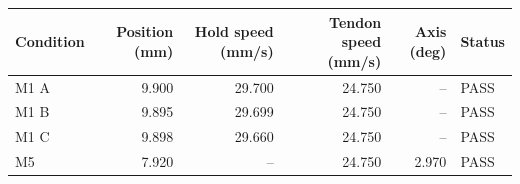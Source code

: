 \begin{tabular}{lrrrrl}
\toprule
Condition & Position (mm) & Hold speed (mm/s) & Tendon speed (mm/s) & Axis (deg) & Status \\
\midrule
M1 A & 9.900 & 29.700 & 24.750 & -- & PASS \\
M1 B & 9.895 & 29.699 & 24.750 & -- & PASS \\
M1 C & 9.898 & 29.660 & 24.750 & -- & PASS \\
M5 & 7.920 & -- & 24.750 & 2.970 & PASS \\
\bottomrule
\end{tabular}
